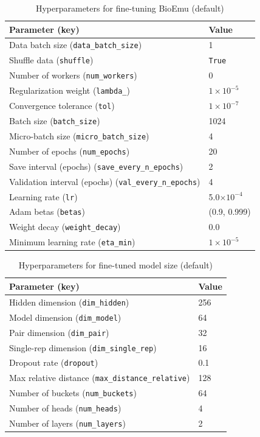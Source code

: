 \documentclass{article}
\theoremstyle{plain}
\theoremstyle{definition}
\theoremstyle{remark}
\begin{document}
\begin{table}[!ht]
\centering
\caption{Hyperparameters for fine-tuning BioEmu (default)}
\label{tab:finetune_hyperparameters}
\begin{tabular}{ll}
\toprule
Parameter (key) & Value \\
\midrule
Data batch size (\texttt{data\_batch\_size}) & 1 \\
Shuffle data (\texttt{shuffle}) & \texttt{True} \\
Number of workers (\texttt{num\_workers}) & 0 \\
Regularization weight (\texttt{lambda\_}) & $1\times10^{-5}$ \\
Convergence tolerance (\texttt{tol}) & $1\times10^{-7}$ \\
Batch size (\texttt{batch\_size}) & 1024 \\
Micro-batch size (\texttt{micro\_batch\_size}) & 4 \\
Number of epochs (\texttt{num\_epochs}) & 20 \\
Save interval (epochs) (\texttt{save\_every\_n\_epochs}) & 2 \\
Validation interval (epochs) (\texttt{val\_every\_n\_epochs}) & 4 \\
Learning rate (\texttt{lr}) & 5.0$\times10^{-4}$ \\
Adam betas (\texttt{betas}) & (0.9, 0.999) \\
Weight decay (\texttt{weight\_decay}) & 0.0 \\
Minimum learning rate (\texttt{eta\_min}) & $1\times10^{-5}$ \\
\bottomrule
\end{tabular}
\end{table}

\begin{table}[!ht]
\centering
\caption{Hyperparameters for fine-tuned model size (default)}
\label{tab:finetune_model_size_hyperparameters}
\begin{tabular}{ll}
\toprule
Parameter (key) & Value \\
\midrule
Hidden dimension (\texttt{dim\_hidden}) & 256 \\
Model dimension (\texttt{dim\_model}) & 64 \\
Pair dimension (\texttt{dim\_pair}) & 32 \\
Single-rep dimension (\texttt{dim\_single\_rep}) & 16 \\
Dropout rate (\texttt{dropout}) & 0.1 \\
Max relative distance (\texttt{max\_distance\_relative}) & 128 \\
Number of buckets (\texttt{num\_buckets}) & 64 \\
Number of heads (\texttt{num\_heads}) & 4 \\
Number of layers (\texttt{num\_layers}) & 2 \\
\bottomrule
\end{tabular}
\end{table}
\end{document}
